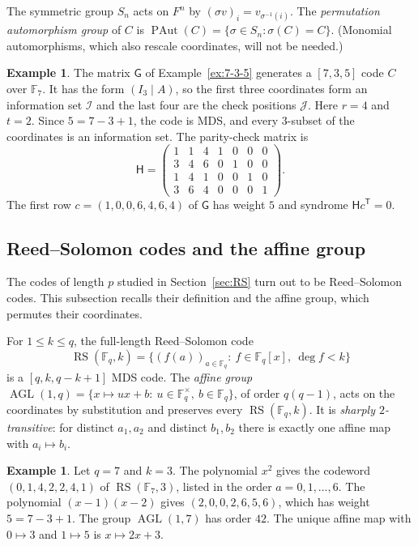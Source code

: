 \documentclass[12pt,letterpaper]{article}
\theoremstyle{definition}
\newtheorem{example}[theorem]{Example}
\theoremstyle{remark}
\numberwithin{equation}{section}
\newcommand{\F}{\mathbb{F}}
\newcommand{\RS}{\operatorname{RS}}
\newcommand{\PAut}{\operatorname{PAut}}
\newcommand{\AGL}{\operatorname{AGL}}
\newcommand{\Gsys}{\mathsf{G}}
\newcommand{\Hsys}{\mathsf{H}}
\newcommand{\cI}{\mathcal{I}}
\newcommand{\cJ}{\mathcal{J}}
\begin{document}
The symmetric group $S_n$ acts on $F^n$ by
$(\sigma v)_i=v_{\sigma^{-1}(i)}$.  The \emph{permutation automorphism
group} of $C$ is
$\PAut(C)=\{\sigma\in S_n:\sigma(C)=C\}$.
(Monomial automorphisms, which also rescale coordinates, will not be
needed.)

\begin{example}\label{ex:bg-codes}
The matrix $\Gsys$ of Example~\ref{ex:7-3-5} generates a $[7,3,5]$ code
$C$ over $\F_7$. It has the form $(I_3\mid A)$, so the first three
coordinates form an information set $\cI$ and the last four are the check
positions $\cJ$. Here $r=4$ and $t=2$. Since $5=7-3+1$, the code is MDS,
and every $3$-subset of the coordinates is an information set. The
parity-check matrix is
\[
\Hsys=\begin{pmatrix}
1&1&4&1&0&0&0\\
3&4&6&0&1&0&0\\
1&4&1&0&0&1&0\\
3&6&4&0&0&0&1
\end{pmatrix}.
\]
The first row $c=(1,0,0,6,4,6,4)$ of $\Gsys$ has weight $5$ and syndrome
$\Hsys c^{\mathsf T}=0$.
\end{example}

\subsection{Reed--Solomon codes and the affine group}\label{subsec:bg-rs}
The codes of length $p$ studied in Section~\ref{sec:RS} turn out to be
Reed--Solomon codes. This subsection recalls their definition and the
affine group, which permutes their coordinates.

For $1\le k\le q$, the full-length Reed--Solomon code
\[
\RS(\F_q,k)=\{(f(a))_{a\in\F_q}:\ f\in\F_q[x],\ \deg f<k\}
\]
is a $[q,k,q-k+1]$ MDS code.  The \emph{affine group}
$\AGL(1,q)=\{x\mapsto ux+b:\ u\in\F_q^\times,\ b\in\F_q\}$, of order
$q(q-1)$, acts on the coordinates by substitution and preserves every
$\RS(\F_q,k)$.  It is \emph{sharply $2$-transitive}: for distinct
$a_1,a_2$ and distinct $b_1,b_2$ there is exactly one affine map with
$a_i\mapsto b_i$.

\begin{example}\label{ex:rs7}
Let $q=7$ and $k=3$. The polynomial $x^2$ gives the codeword
$(0,1,4,2,2,4,1)$ of $\RS(\F_7,3)$, listed in the order $a=0,1,\dots,6$.
The polynomial $(x-1)(x-2)$ gives $(2,0,0,2,6,5,6)$, which has weight
$5=7-3+1$. The group $\AGL(1,7)$ has order $42$. The unique affine map
with $0\mapsto3$ and $1\mapsto5$ is $x\mapsto2x+3$.
\end{example}
\end{document}
